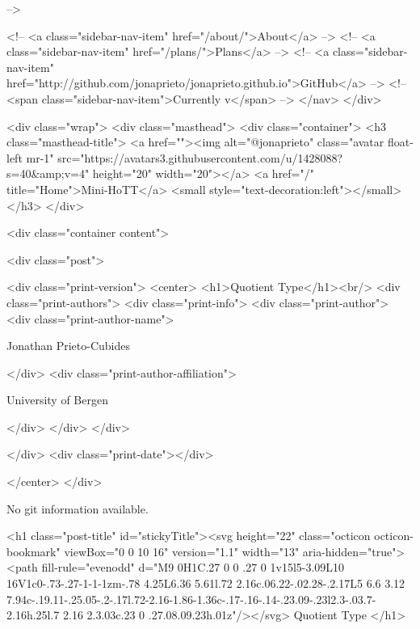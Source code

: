       
     -->

    <!-- <a class="sidebar-nav-item" href="/about/">About</a> -->
    <!-- <a class="sidebar-nav-item" href="/plans/">Plans</a> -->
    <!-- <a class="sidebar-nav-item" href="http://github.com/jonaprieto/jonaprieto.github.io">GitHub</a> -->
    <!-- <span class="sidebar-nav-item">Currently v</span> -->
  </nav>
</div>

    <div class="wrap">
      <div class="masthead">
        <div class="container">
          <h3 class="masthead-title">
            <a href=""><img alt="@jonaprieto" class="avatar float-left mr-1" src="https://avatars3.githubusercontent.com/u/1428088?s=40&amp;v=4" height="20" width="20"></a>
            <a href="/" title="Home">Mini-HoTT</a>
            <small style="text-decoration:left"></small>
          </h3>
        </div>
      
      <div class="container content">
        







<div class="post">

  <div class="print-version">
    <center>
      <h1>Quotient Type</h1><br/>
        <div class="print-authors">
          <div class="print-info">
            <div class="print-author">
              <div class="print-author-name">
                
                  Jonathan Prieto-Cubides
                
              </div>
              <div class="print-author-affiliation">
                
                  University of Bergen
                
                </div>
            </div>
          </div>
          
          
        </div>
        <div class="print-date"></div>
        
        
    </center>
  </div>

  
  No git information available.
  
  <h1 class="post-title" id="stickyTitle"><svg height="22" class="octicon octicon-bookmark" viewBox="0 0 10 16" version="1.1" width="13" aria-hidden="true"><path fill-rule="evenodd" d="M9 0H1C.27 0 0 .27 0 1v15l5-3.09L10 16V1c0-.73-.27-1-1-1zm-.78 4.25L6.36 5.61l.72 2.16c.06.22-.02.28-.2.17L5 6.6 3.12 7.94c-.19.11-.25.05-.2-.17l.72-2.16-1.86-1.36c-.17-.16-.14-.23.09-.23l2.3-.03.7-2.16h.25l.7 2.16 2.3.03c.23 0 .27.08.09.23h.01z"/></svg> Quotient Type
  </h1>

